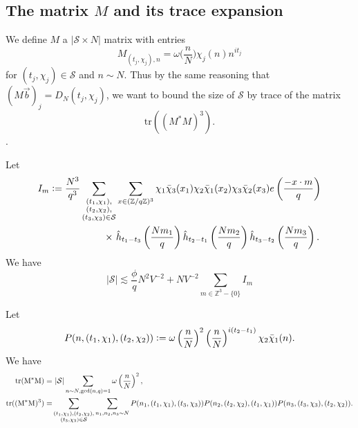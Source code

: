 \subsection{The matrix $M$ and its trace expansion}
We define $M$ a $|\mathcal{S}\times N|$ matrix with entries
\[
    M_{(t_j,\chi_j),n} = \omega\Big(\frac{n}{N}\Big)\chi_j(n)n^{it_j}
\]
for $(t_j,\chi_j)\in\mathcal{S}$ and $n\sim N$.
Thus by the same reasoning that $(M\vec{b})_j=D_N(t_j,\chi_j)$,
we want to bound the size of $\mathcal{S}$ by trace of the matrix \[
\textrm{tr}((M^*M)^3).
\].

\begin{proposition} \label{setup_poisson}
    Let  \begin{align*}
        I_m\defeq\frac{N^3}{q^3}\sum_{\substack{(t_1,\chi_1),\\(t_2,\chi_2),\\(t_3,\chi_3)\in\mathcal{S}}} &\sum_{x\in (\mathbb{Z}/q\mathbb{Z})^3}\chi_1\bar{\chi}_3(x_1)\chi_2\bar{\chi}_1(x_2)\chi_3\bar{\chi}_2(x_3) e\left(\frac{-x\cdot m}{q}\right)\\
        \times \ &\hat{h}_{t_1-t_3}\left(\frac{Nm_1}{q}\right)\hat{h}_{t_2-t_1}\left(\frac{Nm_2}{q}\right)\hat{h}_{t_3-t_2}\left(\frac{Nm_3}{q}\right).
    \end{align*}
    We have \[
    |\mathcal{S}|\lesssim \frac{\phi}{q}N^2V^{-2}+ NV^{-2}\sum_{m\in\mathbb{Z}^3 - \{0\}} I_m
    \]
\end{proposition}
\begin{lemma}
    Let \[
    P(n,(t_1,\chi_1),(t_2,\chi_2))\mathrel{\mathop:}= \omega\left(\frac{n}{N}\right)^2 \left(\frac{n}{N}\right)^{i(t_2-t_1)}\chi_2\bar{\chi}_1(n).
    \]
    We have 
    \begin{align*}
        \rm{tr}(M^*M) = & \ |\mathcal{S}|\sum_{n\sim N, \gcd (n,q)=1} \omega\left(\frac{n}{N}\right)^2, \\
        \rm{tr}((M^*M)^3)=&\sum_{\substack{(t_1,\chi_1),(t_2,\chi_2),\\(t_3,\chi_3)\in\mathcal{S}}}\sum_{n_1,n_2,n_3\sim N} 
        P(n_1,(t_1,\chi_1),(t_3,\chi_3))P(n_2,(t_2,\chi_2),(t_1,\chi_1))P(n_3,(t_3,\chi_3),(t_2,\chi_2)).
    \end{align*}
\end{lemma}
